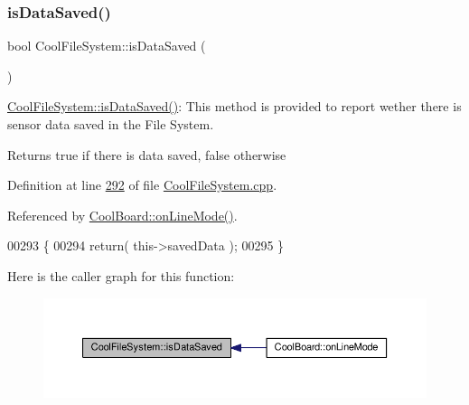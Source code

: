 \mbox{\label{class_cool_file_system_a5a7eaeea7a9fbf8aaef651d862fa3b5b}} 
\subsubsection{\texorpdfstring{is\+Data\+Saved()}{isDataSaved()}}
{\footnotesize\ttfamily bool Cool\+File\+System\+::is\+Data\+Saved (\begin{DoxyParamCaption}{ }\end{DoxyParamCaption})}

\hyperlink{class_cool_file_system_a5a7eaeea7a9fbf8aaef651d862fa3b5b}{Cool\+File\+System\+::is\+Data\+Saved()}\+: This method is provided to report wether there is sensor data saved in the File System.

\begin{DoxyReturn}{Returns}
true if there is data saved, false otherwise 
\end{DoxyReturn}


Definition at line \hyperlink{_cool_file_system_8cpp_source_l00292}{292} of file \hyperlink{_cool_file_system_8cpp_source}{Cool\+File\+System.\+cpp}.



Referenced by \hyperlink{_cool_board_8cpp_source_l00097}{Cool\+Board\+::on\+Line\+Mode()}.


\begin{DoxyCode}
00293 \{
00294     \textcolor{keywordflow}{return}( this->savedData );
00295 \}
\end{DoxyCode}
Here is the caller graph for this function\+:
\nopagebreak
\begin{figure}[H]
\begin{center}
\leavevmode
\includegraphics[width=350pt]{class_cool_file_system_a5a7eaeea7a9fbf8aaef651d862fa3b5b_icgraph}
\end{center}
\end{figure}
\mbox{\label{class_cool_file_system_a4c560c2ddd40b74b7758e6ceb2c58957}} 
